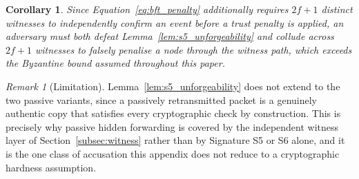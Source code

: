 \documentclass[lettersize,journal]{IEEEtran}
\theoremstyle{plain}
\newtheorem{corollary}[lemma]{Corollary}
\theoremstyle{remark}
\newtheorem{remark}{Remark}
\begin{document}
	\begin{corollary}
		Since Equation~\eqref{eq:bft_penalty} additionally requires
		$2f{+}1$ distinct witnesses to independently confirm an event
		before a trust penalty is applied, an adversary must both defeat
		Lemma~\ref{lem:s5_unforgeability} and collude across $2f{+}1$
		witnesses to falsely penalise a node through the witness path,
		which exceeds the Byzantine bound assumed throughout this paper.
	\end{corollary}
	
	\begin{remark}[Limitation]
		Lemma~\ref{lem:s5_unforgeability} does not extend to the two
		passive variants, since a passively retransmitted packet is a
		genuinely authentic copy that satisfies every cryptographic check
		by construction. This is precisely why passive hidden forwarding
		is covered by the independent witness layer of
		Section~\ref{subsec:witness} rather than by Signature S5 or S6
		alone, and it is the one class of accusation this appendix does
		not reduce to a cryptographic hardness assumption.
	\end{remark}
	
	
	
\end{document}
